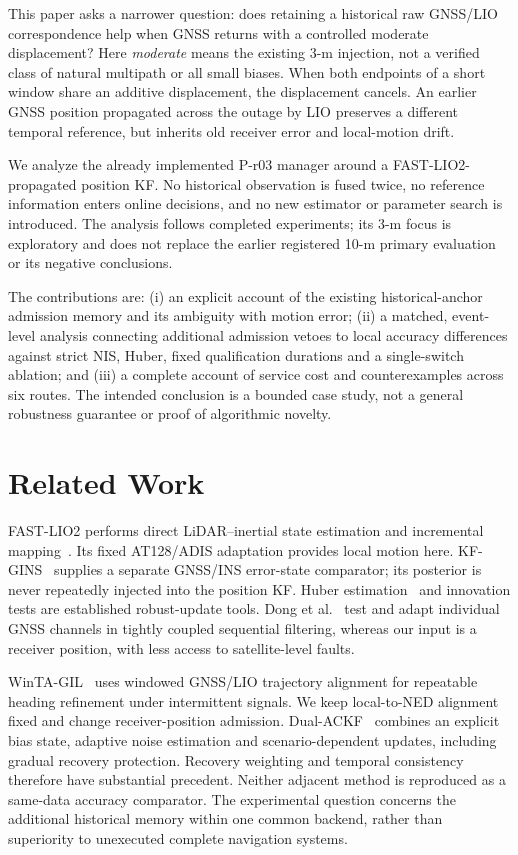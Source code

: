 \documentclass[conference]{IEEEtran}
\begin{document}
This paper asks a narrower question: does retaining a historical raw GNSS/LIO correspondence help when GNSS returns with a controlled moderate displacement? Here \emph{moderate} means the existing 3-m injection, not a verified class of natural multipath or all small biases. When both endpoints of a short window share an additive displacement, the displacement cancels. An earlier GNSS position propagated across the outage by LIO preserves a different temporal reference, but inherits old receiver error and local-motion drift.

We analyze the already implemented P-r03 manager around a FAST-LIO2-propagated position KF. No historical observation is fused twice, no reference information enters online decisions, and no new estimator or parameter search is introduced. The analysis follows completed experiments; its 3-m focus is exploratory and does not replace the earlier registered 10-m primary evaluation or its negative conclusions.

The contributions are: (i) an explicit account of the existing historical-anchor admission memory and its ambiguity with motion error; (ii) a matched, event-level analysis connecting additional admission vetoes to local accuracy differences against strict NIS, Huber, fixed qualification durations and a single-switch ablation; and (iii) a complete account of service cost and counterexamples across six routes. The intended conclusion is a bounded case study, not a general robustness guarantee or proof of algorithmic novelty.

\section{Related Work}
FAST-LIO2 performs direct LiDAR--inertial state estimation and incremental mapping~\cite{fastlio2}. Its fixed AT128/ADIS adaptation provides local motion here. KF-GINS~\cite{kfgins} supplies a separate GNSS/INS error-state comparator; its posterior is never repeatedly injected into the position KF. Huber estimation~\cite{huber} and innovation tests are established robust-update tools. Dong et al.~\cite{dong2020} test and adapt individual GNSS channels in tightly coupled sequential filtering, whereas our input is a receiver position, with less access to satellite-level faults.

WinTA-GIL~\cite{winta} uses windowed GNSS/LIO trajectory alignment for repeatable heading refinement under intermittent signals. We keep local-to-NED alignment fixed and change receiver-position admission. Dual-ACKF~\cite{dual} combines an explicit bias state, adaptive noise estimation and scenario-dependent updates, including gradual recovery protection. Recovery weighting and temporal consistency therefore have substantial precedent. Neither adjacent method is reproduced as a same-data accuracy comparator. The experimental question concerns the additional historical memory within one common backend, rather than superiority to unexecuted complete navigation systems.
\end{document}
